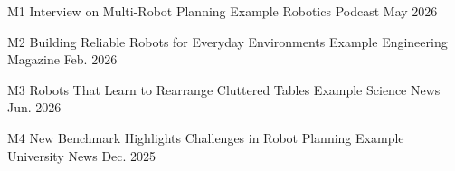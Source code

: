 

\VectraMediaEntry
    {M1}
    {Interview on Multi-Robot Planning}
    {Example Robotics Podcast}
    {
    }
    {May 2026}

\VectraMediaEntry
    {M2}
    {Building Reliable Robots for Everyday Environments}
    {Example Engineering Magazine}
    {
    }
    {Feb. 2026}


\VectraMediaEntry
    {M3}
    {Robots That Learn to Rearrange Cluttered Tables}
    {Example Science News}
    {
    }
    {Jun. 2026}

\VectraMediaEntry
    {M4}
    {New Benchmark Highlights Challenges in Robot Planning}
    {Example University News}
    {}
    {Dec. 2025}
